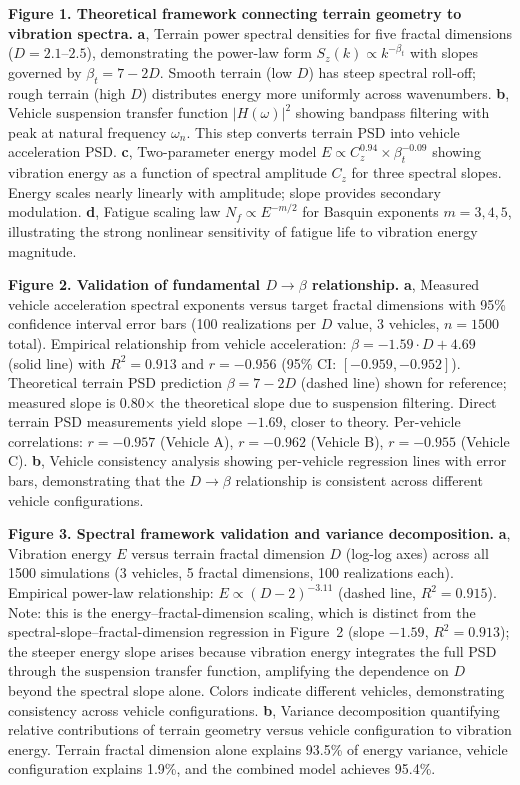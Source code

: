 \documentclass[11pt]{article}
\begin{document}
\textbf{Figure 1. Theoretical framework connecting terrain geometry to vibration spectra.} 
\textbf{a}, Terrain power spectral densities for five fractal dimensions ($D = 2.1$--$2.5$), demonstrating the power-law form $S_z(k) \propto k^{-\beta_t}$ with slopes governed by $\beta_t = 7-2D$. Smooth terrain (low $D$) has steep spectral roll-off; rough terrain (high $D$) distributes energy more uniformly across wavenumbers.
\textbf{b}, Vehicle suspension transfer function $|H(\omega)|^2$ showing bandpass filtering with peak at natural frequency $\omega_n$. This step converts terrain PSD into vehicle acceleration PSD.
\textbf{c}, Two-parameter energy model $E \propto C_z^{0.94} \times \beta_t^{-0.09}$ showing vibration energy as a function of spectral amplitude $C_z$ for three spectral slopes. Energy scales nearly linearly with amplitude; slope provides secondary modulation.
\textbf{d}, Fatigue scaling law $N_f \propto E^{-m/2}$ for Basquin exponents $m = 3, 4, 5$, illustrating the strong nonlinear sensitivity of fatigue life to vibration energy magnitude.

\textbf{Figure 2. Validation of fundamental $D \rightarrow \beta$ relationship.} 
\textbf{a}, Measured vehicle acceleration spectral exponents versus target fractal dimensions with 95\% confidence interval error bars (100 realizations per $D$ value, 3 vehicles, $n=1500$ total). Empirical relationship from vehicle acceleration: $\beta = -1.59 \cdot D + 4.69$ (solid line) with $R^2 = 0.913$ and $r = -0.956$ (95\% CI: $[-0.959, -0.952]$). Theoretical terrain PSD prediction $\beta = 7-2D$ (dashed line) shown for reference; measured slope is 0.80$\times$ the theoretical slope due to suspension filtering. Direct terrain PSD measurements yield slope $-1.69$, closer to theory. Per-vehicle correlations: $r = -0.957$ (Vehicle A), $r = -0.962$ (Vehicle B), $r = -0.955$ (Vehicle C).
\textbf{b}, Vehicle consistency analysis showing per-vehicle regression lines with error bars, demonstrating that the $D \rightarrow \beta$ relationship is consistent across different vehicle configurations.

\textbf{Figure 3. Spectral framework validation and variance decomposition.}
\textbf{a}, Vibration energy $E$ versus terrain fractal dimension $D$ (log-log axes) across all 1500 simulations (3 vehicles, 5 fractal dimensions, 100 realizations each). Empirical power-law relationship: $E \propto (D-2)^{-3.11}$ (dashed line, $R^2 = 0.915$). Note: this is the energy--fractal-dimension scaling, which is distinct from the spectral-slope--fractal-dimension regression in Figure~2 (slope $-1.59$, $R^2 = 0.913$); the steeper energy slope arises because vibration energy integrates the full PSD through the suspension transfer function, amplifying the dependence on $D$ beyond the spectral slope alone. Colors indicate different vehicles, demonstrating consistency across vehicle configurations.
\textbf{b}, Variance decomposition quantifying relative contributions of terrain geometry versus vehicle configuration to vibration energy. Terrain fractal dimension alone explains 93.5\% of energy variance, vehicle configuration explains 1.9\%, and the combined model achieves 95.4\%.
\end{document}
